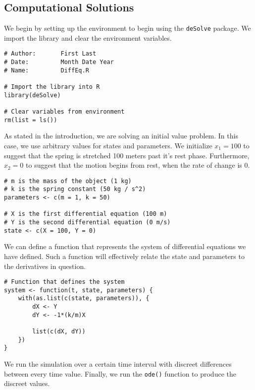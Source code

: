 \subsection{Computational Solutions}

We begin by setting up the environment to begin using the \texttt{deSolve} package. We import the library and clear the environment variables.\\

\begin{lstlisting}
# Author:       First Last
# Date:         Month Date Year
# Name:         DiffEq.R

# Import the library into R
library(deSolve)

# Clear variables from environment
rm(list = ls())
\end{lstlisting}

As stated in the introduction, we are solving an initial value problem. In this case, we use arbitrary values for states and parameters. We initialize $x_1=100$ to suggest that the spring is stretched 100 meters past it's rest phase. Furthermore, $x_2=0$ to suggest that the motion begins from rest, when the rate of change is 0.\\

\begin{lstlisting}
# m is the mass of the object (1 kg)
# k is the spring constant (50 kg / s^2)
parameters <- c(m = 1, k = 50)

# X is the first differential equation (100 m)
# Y is the second differential equation (0 m/s)
state <- c(X = 100, Y = 0)
\end{lstlisting}

We can define a function that represents the system of differential equations we have defined. Such a function will effectively relate the state and parameters to the derivatives in question. 

\begin{lstlisting}
# Function that defines the system
system <- function(t, state, parameters) {
    with(as.list(c(state, parameters)), {
        dX <- Y
        dY <- -1*(k/m)X
        
        list(c(dX, dY))
    })
}
\end{lstlisting}

We run the simulation over a certain time interval with discreet differences between every time value. Finally, we run the \texttt{ode()} function to produce the discreet values.\\

